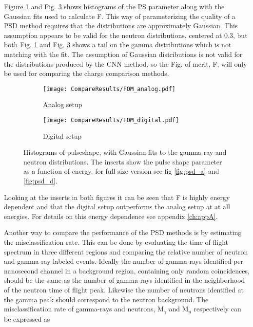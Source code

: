 \documentclass[main.tex]{subfiles}
\begin{document}
Figure \ref{fig:fom_analog} and Fig. \ref{fig:fom_digital} shows histograms of the PS parameter along with the Gaussian fits used to calculate F. This way of parameterizing the quality of a PSD method requires that the distributions are approximately Gaussian. This assumption appears to be valid for the neutron distributions, centered at 0.3, but both Fig. \ref{fig:fom_analog} and Fig. \ref{fig:fom_digital} shows a tail on the gamma distributions which is not matching with the fit. The assumption of Gaussian distributions is not valid for the distributions produced by the CNN method, so the Fig. of merit, F, will only be used for comparing the charge comparison methods. 

\begin{figure}[h!]
	\begin{subfigure}[b]{\textwidth}
	    \centering
    	    \texttt{[image: CompareResults/FOM\_analog.pdf]}
        	\caption{Analog setup}
	    \label{fig:fom_analog} 
	\end{subfigure}
	\begin{subfigure}[b]{\textwidth}
    	\centering
        	\texttt{[image: CompareResults/FOM\_digital.pdf]}
        	\caption{Digital setup}
    	\label{fig:fom_digital} 
    \end{subfigure}
    \caption[Histograms of pulseshape, with Gaussian fits.]{Histograms of pulseshape, with Gaussian fits to the gamma-ray and neutron distributions. The inserts show the pulse shape parameter as a function of energy, for full size version see fig \ref{fig:psd_a} and \ref{fig:psd_d}. }
\end{figure}

Looking at the inserts in both figures it can be seen that F is highly energy dependent and that the digital setup outperforms the analog setup at at all energies. For details on this energy dependence see appendix \ref{ch:appA}. 

Another way to compare the performance of the PSD methods is by estimating the misclassification rate. This can be done by evaluating the time of flight spectrum in three different regions and comparing the relative number of neutron and gamma-ray labeled events. Ideally the number of gamma-rays identified per nanosecond channel in a background region, containing only random coincidences, should be the same as the number of gamma-rays identified in the neighborhood of the neutron time of flight peak. Likewise the number of neutrons identified at the gamma peak should correspond to the neutron background. The misclassification rate of gamma-rays and neutrons, 
M$_{\gamma}$ and M$_\textrm{n}$ respectively can be expressed as
\end{document}
